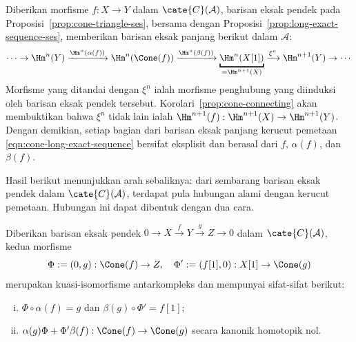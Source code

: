 Diberikan morfisme $f:X\to Y$ dalam $\cate{C}(\mathcal{A})$, barisan eksak
pendek pada Proposisi~\ref{prop:cone-triangle-ses}, bersama dengan
Proposisi~\ref{prop:long-exact-sequence-ses}, memberikan barisan eksak panjang
berikut dalam $\mathcal{A}$:
\begin{equation}\label{eqn:cone-long-exact-sequence}
	\cdots \to \Hm^n(Y) \xrightarrow{\Hm^n(\alpha(f))} \Hm^n(\Cone(f)) \xrightarrow{\Hm^n(\beta(f))} \underbracket{\Hm^n(X[1])}_{= \Hm^{n+1}(X)} \xrightarrow{\xi^n} \Hm^{n+1}(Y) \to \cdots
\end{equation}
Morfisme yang ditandai dengan $\xi^n$ ialah morfisme penghubung yang
diinduksi oleh barisan eksak pendek tersebut. Korolari~\ref{prop:cone-connecting}
akan membuktikan bahwa $\xi^n$ tidak lain ialah
$\Hm^{n+1}(f):\Hm^{n+1}(X)\to\Hm^{n+1}(Y)$. Dengan demikian, setiap bagian
dari barisan eksak panjang kerucut pemetaan
\eqref{eqn:cone-long-exact-sequence} bersifat eksplisit dan berasal dari
$f$, $\alpha(f)$, dan $\beta(f)$.

Hasil berikut menunjukkan arah sebaliknya: dari sembarang barisan eksak pendek
dalam $\cate{C}(\mathcal{A})$, terdapat pula hubungan alami dengan kerucut
pemetaan. Hubungan ini dapat dibentuk dengan dua cara.

\begin{lema}\label{prop:cone-qis}
	Diberikan barisan eksak pendek
	$0\to X\xrightarrow{f}Y\xrightarrow{g}Z\to0$ dalam
	$\cate{C}(\mathcal{A})$, kedua morfisme
	\[ \Phi := (0, g): \Cone(f) \to Z, \quad \Phi' := (f[1], 0): X[1] \to \Cone(g) \]
	merupakan kuasi-isomorfisme antarkompleks dan mempunyai sifat-sifat berikut:
	\begin{enumerate}[(i)]
		\item $\Phi \circ \alpha(f) = g$ dan $\beta(g) \circ \Phi' = f[1]$;
		\item $\alpha(g)\Phi + \Phi'\beta(f):\Cone(f)\to\Cone(g)$ secara
		kanonik homotopik nol.
	\end{enumerate}
\end{lema}

